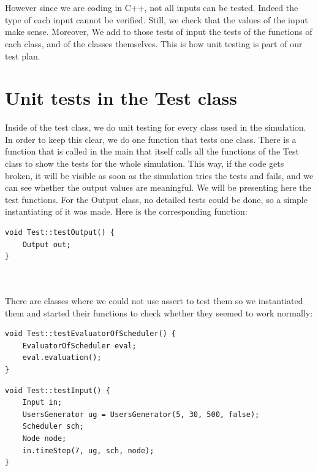 \documentclass [10 pt, a4 paper]{report}
\begin{document}
\noindent
\\ \\
However since we are coding in C++, not all inputs can be tested. Indeed the type of each input cannot be verified. Still, we check that the values of the input make sense. Moreover, We add to those tests of input the tests of the functions of each class, and of the classes themselves. This is how unit testing is part of our test plan.











\clearpage
\section{Unit tests in the Test class}

Inside of the test class, we do unit testing for every class used in the simulation. In order to keep this clear, we do one function that tests one class. There is a function that is called in the main that itself calls all the functions of the Test class to show the tests for the whole simulation. This way, if the code gets broken, it will be visible as soon as the simulation tries the tests and fails, and we can see whether the output values are meaningful. We will be presenting here the test functions. For the Output class, no detailed tests could be done, so a simple instantiating of it was made. Here is the corresponding function:

\begin{lstlisting}[caption=testOutput function of the class Test, label={lst:code1}, frame=single]
void Test::testOutput() {
	Output out;
}
\end{lstlisting}



\noindent
\\ \\
There are classes where we could not use assert to test them so we instantiated them and started their functions to check whether they seemed to work normally:

\begin{lstlisting}[caption=testEvaluatorOfScheduler function of the class Test, label={lst:code1}, frame=single]
void Test::testEvaluatorOfScheduler() {
	EvaluatorOfScheduler eval;
	eval.evaluation();
}
\end{lstlisting}

\begin{lstlisting}[caption=testInput function of the class Test, label={lst:code1}, frame=single]
void Test::testInput() {
	Input in;
	UsersGenerator ug = UsersGenerator(5, 30, 500, false);
	Scheduler sch;
	Node node;
	in.timeStep(7, ug, sch, node);
}
\end{lstlisting}
\end{document}
